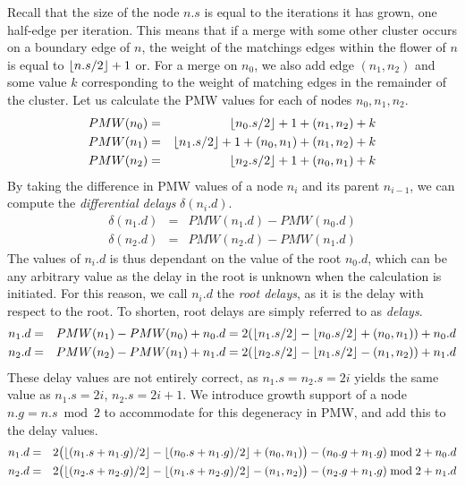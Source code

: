 Recall that the size of the node $n.s$ is equal to the iterations it has grown, one half-edge per iteration. This means that if a merge with some other cluster occurs on a boundary edge of $n$, the weight of the matchings edges within the flower of $n$ is equal to ${\left \lfloor n.s/2 \right \rfloor }+1$ or. For a merge on $n_0$, we also add edge $(n_1,n_2)$ and some value $k$ corresponding to the weight of matching edges in the remainder of the cluster. Let us calculate the PMW values for each of nodes $n_0, n_1, n_2$.
\begin{eqnarray*}
  PMW(n_0) &=& {\left \lfloor n_0.s/2 \right \rfloor }+1 + (n_1,n_2) + k \\
  PMW(n_1) &=& {\left \lfloor n_1.s/2 \right \rfloor }+1 + (n_0,n_1) + (n_1,n_2)+ k \\
  PMW(n_2) &=& {\left \lfloor n_2.s/2 \right \rfloor }+1 + (n_0,n_1) +k
\end{eqnarray*}
By taking the difference in PMW values of a node $n_i$ and its parent $n_{i-1}$, we can compute the \emph{differential delays} $\delta(n_i.d)$.
\begin{eqnarray*}
  \delta(n_1.d) &=& PMW(n_1.d) - PMW(n_0.d) \\
  \delta(n_2.d) &=& PMW(n_2.d) - PMW(n_1.d)
\end{eqnarray*}
The values of $n_i.d$ is thus dependant on the value of the root $n_0.d$, which can be any arbitrary value as the delay in the root is unknown when the calculation is initiated. For this reason, we call $n_i.d$ the \emph{root delays}, as it is the delay with respect to the root. To shorten, root delays are simply referred to as \emph{delays}.
\begin{eqnarray*}
  n_1.d &=& PMW(n_1) - PMW(n_0) + n_0.d = 2({\left \lfloor n_1.s/2 \right \rfloor } - {\left \lfloor n_0.s/2 \right \rfloor } + (n_0,n_1)) + n_0.d \\
  n_2.d &=& PMW(n_2) - PMW(n_1) + n_1.d = 2({\left \lfloor n_2.s/2 \right \rfloor } - {\left \lfloor n_1.s/2 \right \rfloor } - (n_1,n_2)) + n_1.d
\end{eqnarray*}
These delay values are not entirely correct, as $n_1.s = n_2.s = 2i$ yields the same value as  $n_1.s = 2i$, $n_2.s = 2i + 1$. We introduce growth support of a node $n.g = n.s \bmod 2$ to accommodate for this degeneracy in PMW, and add this to the delay values.
\begin{eqnarray*}
  n_1.d &=& 2\big({\left \lfloor (n_1.s+n_1.g)/2 \right \rfloor } - {\left \lfloor (n_0.s+n_1.g)/2 \right \rfloor } + (n_0,n_1)\big) - (n_0.g + n_1.g)\bmod 2 + n_0.d \\
  n_2.d &=& 2\big({\left \lfloor (n_2.s+n_2.g)/2 \right \rfloor } - {\left \lfloor (n_1.s+n_2.g)/2 \right \rfloor } - (n_1,n_2)\big) - (n_2.g + n_1.g)\bmod 2 + n_1.d
\end{eqnarray*}
